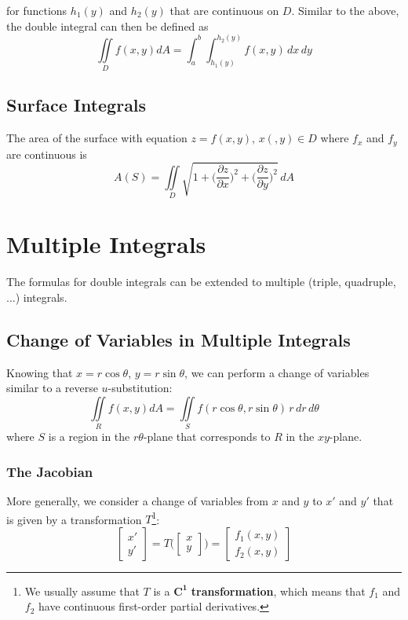 for functions $h_{1}(y)$ and $h_{2}(y)$ that are continuous on $D$. Similar to the above, the double integral can then be defined as $$\iint\limits_{D} f(x,y) dA = \int_{a}^{b} \int_{h_{1}(y)}^{h_{2}(y)} f(x, y) \, dx \, dy$$

\subsection{Surface Integrals}

The area of the surface with equation $ z = f(x,y), \, x(,y) \in D $ where $f_{x}$ and $f_{y}$ are continuous is $$ A(S) = \iint\limits_{D} \sqrt{1 + \Big( \frac{\partial z}{\partial x} \Big)^{2} + \Big( \frac{\partial z}{\partial y} \Big)^{2} } \, dA$$

\section{Multiple Integrals}

The formulas for double integrals can be extended to multiple (triple, quadruple, ...) integrals.

\subsection{Change of Variables in Multiple Integrals}

Knowing that $x = r\cos{\theta}$, $y = r\sin{\theta}$, we can perform a change of variables similar to a reverse $u$-substitution: $$ \iint\limits_{R} f(x,y) dA = \iint\limits_{S} f(r\cos{\theta}, r\sin{\theta}) \, r \, dr \, d\theta  $$ where $S$ is a region in the $r\theta$-plane that corresponds to $R$ in the $xy$-plane.

\subsubsection{The Jacobian}

More generally, we consider a change of variables from $x$ and $y$ to $x'$ and $y'$ that is given by a transformation $T$\footnote{We usually assume that $T$ is a $\mathbf{C^{1}}$ \textbf{transformation}, which means that $f_{1}$ and $f_{2}$ have continuous first-order partial derivatives.}: $$\begin{bmatrix}
x'\\
y'
\end{bmatrix}
= T \Big(
\begin{bmatrix}
x\\
y
\end{bmatrix}
\Big) =
\begin{bmatrix}
f_{1}(x,y)\\
f_{2}(x,y)
\end{bmatrix}$$

